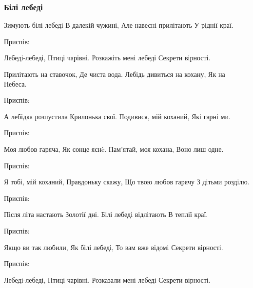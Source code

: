  
 
 

\subsubsection{Білі лебеді}

Зимують білі лебеді
В далекій чужині,
Але навесні прилітають
У ріднії краї.

Приспів:

Лебеді-лебеді,
Птиці чарівні.
Розкажіть мені лебеді
Секрети вірності.

Прилітають на ставочок,
Де чиста вода.
Лебідь дивиться на кохану,
Як на Небеса.

Приспів:

А лебідка розпустила
Крилонька свої.
Подивися, мій коханий,
Які гарні ми.

Приспів:

Моя любов гаряча,
Як сонце яснè.
Пам’ятай, моя кохана,
Воно лиш одне.

Приспів:

Я тобі, мій коханий,
Правдоньку скажу,
Що твою любов гарячу
З дітьми розділю.

Приспів:

Після літа настають
Золотії дні.
Білі лебеді відлітають
В теплії краї.

Приспів:

Якщо ви так любили,
Як білі лебеді,
То вам вже відомі
Секрети вірності.

Приспів:

Лебеді-лебеді,
Птиці чарівні.
Розказали мені лебеді
Секрети вірності. 
